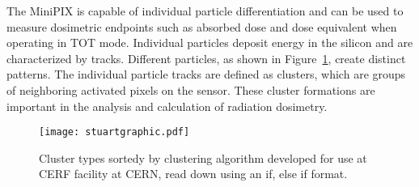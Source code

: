 %
%
%
%
The MiniPIX is capable of individual particle differentiation and can be used to measure dosimetric endpoints such as absorbed dose and dose equivalent when operating in TOT mode. Individual particles deposit energy in the silicon and are characterized by tracks.  Different particles, as shown in Figure~\ref{fig:stuartfigure}, create distinct patterns. The individual particle tracks are defined as clusters, which are groups of neighboring activated pixels on the sensor. These cluster formations are important in the analysis and calculation of radiation dosimetry. 

\begin{figure}[H]
\centering
\texttt{[image: stuartgraphic.pdf]}
\caption{Cluster types sortedy by clustering algorithm developed for use at CERF facility at CERN, read down using an if,
else if format.\cite{stuartalgo}}
\label{fig:stuartfigure}
\end{figure}

